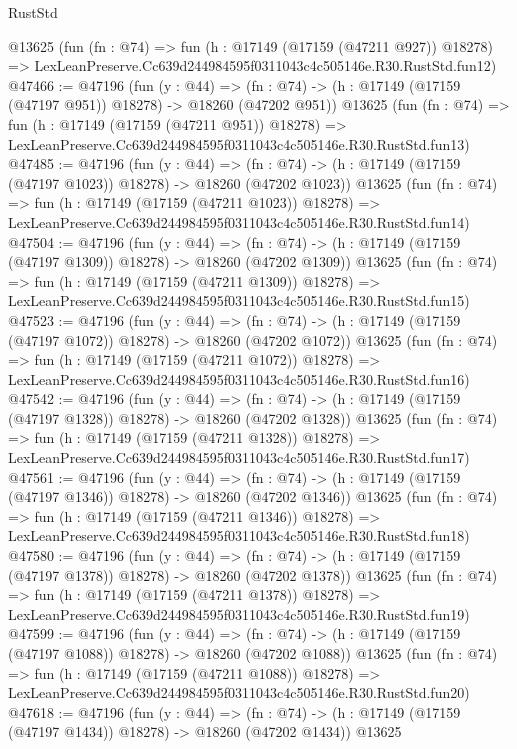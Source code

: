 \begin{lexlean}{RustStd}
\begin{coremodule}
    @13625
    (fun (fn : @74) =>
    fun (h : @17149 (@17159 (@47211 @927)) @18278) =>
    LexLeanPreserve.Cc639d244984595f0311043c4c505146e.R30.RustStd.fun12)
@47466 := @47196
    (fun (y : @44) =>
    (fn : @74) -> (h : @17149 (@17159 (@47197 @951)) @18278) -> @18260 (@47202 @951))
    @13625
    (fun (fn : @74) =>
    fun (h : @17149 (@17159 (@47211 @951)) @18278) =>
    LexLeanPreserve.Cc639d244984595f0311043c4c505146e.R30.RustStd.fun13)
@47485 := @47196
    (fun (y : @44) =>
    (fn : @74) -> (h : @17149 (@17159 (@47197 @1023)) @18278) -> @18260 (@47202 @1023))
    @13625
    (fun (fn : @74) =>
    fun (h : @17149 (@17159 (@47211 @1023)) @18278) =>
    LexLeanPreserve.Cc639d244984595f0311043c4c505146e.R30.RustStd.fun14)
@47504 := @47196
    (fun (y : @44) =>
    (fn : @74) -> (h : @17149 (@17159 (@47197 @1309)) @18278) -> @18260 (@47202 @1309))
    @13625
    (fun (fn : @74) =>
    fun (h : @17149 (@17159 (@47211 @1309)) @18278) =>
    LexLeanPreserve.Cc639d244984595f0311043c4c505146e.R30.RustStd.fun15)
@47523 := @47196
    (fun (y : @44) =>
    (fn : @74) -> (h : @17149 (@17159 (@47197 @1072)) @18278) -> @18260 (@47202 @1072))
    @13625
    (fun (fn : @74) =>
    fun (h : @17149 (@17159 (@47211 @1072)) @18278) =>
    LexLeanPreserve.Cc639d244984595f0311043c4c505146e.R30.RustStd.fun16)
@47542 := @47196
    (fun (y : @44) =>
    (fn : @74) -> (h : @17149 (@17159 (@47197 @1328)) @18278) -> @18260 (@47202 @1328))
    @13625
    (fun (fn : @74) =>
    fun (h : @17149 (@17159 (@47211 @1328)) @18278) =>
    LexLeanPreserve.Cc639d244984595f0311043c4c505146e.R30.RustStd.fun17)
@47561 := @47196
    (fun (y : @44) =>
    (fn : @74) -> (h : @17149 (@17159 (@47197 @1346)) @18278) -> @18260 (@47202 @1346))
    @13625
    (fun (fn : @74) =>
    fun (h : @17149 (@17159 (@47211 @1346)) @18278) =>
    LexLeanPreserve.Cc639d244984595f0311043c4c505146e.R30.RustStd.fun18)
@47580 := @47196
    (fun (y : @44) =>
    (fn : @74) -> (h : @17149 (@17159 (@47197 @1378)) @18278) -> @18260 (@47202 @1378))
    @13625
    (fun (fn : @74) =>
    fun (h : @17149 (@17159 (@47211 @1378)) @18278) =>
    LexLeanPreserve.Cc639d244984595f0311043c4c505146e.R30.RustStd.fun19)
@47599 := @47196
    (fun (y : @44) =>
    (fn : @74) -> (h : @17149 (@17159 (@47197 @1088)) @18278) -> @18260 (@47202 @1088))
    @13625
    (fun (fn : @74) =>
    fun (h : @17149 (@17159 (@47211 @1088)) @18278) =>
    LexLeanPreserve.Cc639d244984595f0311043c4c505146e.R30.RustStd.fun20)
@47618 := @47196
    (fun (y : @44) =>
    (fn : @74) -> (h : @17149 (@17159 (@47197 @1434)) @18278) -> @18260 (@47202 @1434))
    @13625

\end{coremodule}
\end{lexlean}
